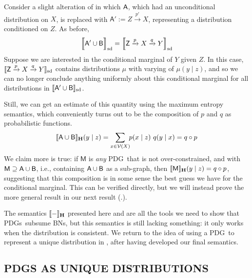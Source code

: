 \documentclass{article}
\newcommand\SD{_{\text{sd}}}
\newcommand\MaxEnt{_{\mathbf H}}
\newcommand{\V}{\mathcal V}
\newcommand{\sfM}{\mathsf M}
\newcommand{\MN}{PDG}
\newcommand{\MNs}{\MN s}
\numberwithin{equation}{section}
\begin{document}
\begin{notfocus}
{	%
	\begin{example}[composition]
		Consider a slight alteration of  in which $\sf A$, which had an unconditional distribution on $X$, is replaced with $\mathsf A' := Z \xrightarrow{p'} X$, representing a distribution conditioned on $Z$. 
		As before,
		\[ \bbr[\Big]{{\sf A' \cup B}}\SD = \bbr[\Big]{{\mathsf Z} \xrightarrow{p} X \xrightarrow{q} Y}\SD \]
		Suppose we are interested in the conditional marginal of $Y$ given $Z$. In this case, $\bbr{{\mathsf Z} \xrightarrow{p} X \xrightarrow{q} Y}\SD $ contains distributions $\mu$ with varying of $\mu(y \mid z)$, and so we can no longer conclude anything uniformly about this conditional marginal for all distributions in $\bbr{{\sf A' \cup B}}\SD$. 
		
		Still, we can get an estimate of this quantity using the maximum entropy semantics, which conveniently turns out to be the composition of $p$ and $q$ as probabilistic functions.
		$$ \bbr{{\sf A \cup B}}\MaxEnt(y \mid z) = \sum_{x \in \V(X)}\!\! p (x \mid z)\ q(y \mid x) = q \circ p $$
		We claim more is true: if $\sfM$ is \emph{any} \MN\ that is not over-constrained, and with $\sfM \supseteq \sf A \cup B$, i.e., containing $\sf A \cup B$ as a sub-graph, then
		$ \bbr{\sfM}\MaxEnt(y \mid z) = q \circ p$,
		suggesting that this composition is in some sense the best guess we have for the conditional marginal. 
		This can be verified directly, but we will instead prove the more general result in our next result (.).
	\end{example}

	The semantics $\bbr{-}\MaxEnt$ presented here and  are all the tools we need to show that \MNs\ subsume BNs, but this semantics is still lacking something: it only works when the distribution is consistent.
	We return to the idea of using a \MN\ to represent a unique distribution in , after having developed our final semantics. 



                \subsection{PDGS AS UNIQUE DISTRIBUTIONS}\label{sec:uniq-dist-semantics-2} 

}
\end{notfocus}
\end{document}
